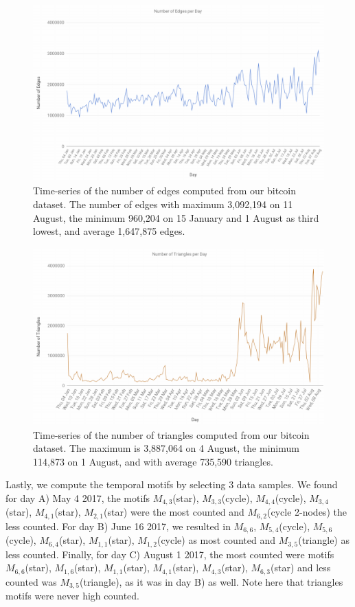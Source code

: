 \documentclass[../../thesis.tex]{subfiles}
\begin{document}
\begin{figure}[H]
\centering
\includegraphics[width=\textwidth]{content/unveiling/img/number_edges_by_time_chart}
\caption{Time-series of the number of edges computed from our bitcoin dataset. The number of edges with maximum 3,092,194 on 11 August, the minimum 960,204 on 15 January and 1 August as third lowest, and average 1,647,875 edges. }
\label{fig:number_edges_by_time_chart}
\end{figure}


\begin{figure}[H]
\centering
\includegraphics[width=\textwidth]{content/unveiling/img/number_triangles_by_time_chart}
\caption{Time-series of the number of triangles computed from our bitcoin dataset. The maximum is 3,887,064 on 4 August, the minimum 114,873 on 1 August, and with average 735,590 triangles.}
\label{fig:number_triangles_by_time_chart}
\end{figure}


Lastly, we compute the temporal motifs by selecting 3 data samples. We found for day A) May 4 2017, the motifs $M_{4,3}$(star), $M_{3,3}$(cycle), $M_{4,4}$(cycle), $M_{3,4}$(star), $M_{4,1}$(star), $M_{2,1}$(star) were the most counted and  $M_{6,2}$(cycle 2-nodes) the less counted. For day B) June 16 2017, we resulted in $M_{6,6}$, $M_{5,4}$(cycle), $M_{5,6}$(cycle), $M_{6,4}$(star), $M_{1,1}$(star), $M_{1,2}$(cycle) as most counted and $M_{3,5}$(triangle) as less counted. Finally, for day C) August 1 2017, the most counted were motifs $M_{6,6}$(star), $M_{1,6}$(star), $M_{1,1}$(star), $M_{4,1}$(star), $M_{4,3}$(star), $M_{6,3}$(star) and less counted was $M_{3,5}$(triangle), as it was in day B) as well. Note here that triangles motifs were never high counted. 
\end{document}
